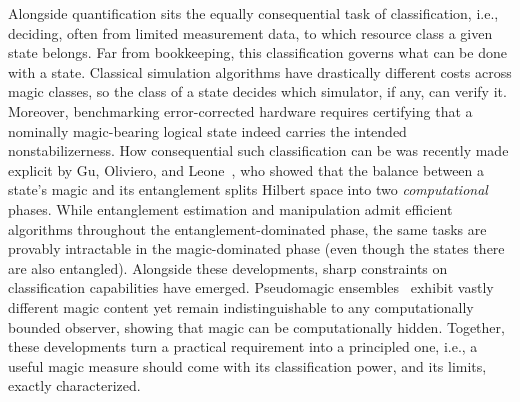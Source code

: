 \documentclass[aps,pra,superscriptaddress,twocolumn,longbibliography]{revtex4-2}
\newcounter{algorithm}
\begin{document}
Alongside quantification sits the equally consequential task of classification, i.e., deciding, often from limited measurement data, to which resource class a given state belongs. Far from bookkeeping, this classification governs what can be done with a state. Classical simulation algorithms have drastically different costs across magic classes, so the class of a state decides which simulator, if any, can verify it.
Moreover, benchmarking error-corrected hardware requires certifying that a nominally magic-bearing logical state indeed carries the intended nonstabilizerness. 
How consequential such classification can be was recently made explicit by Gu, Oliviero, and Leone~\cite{Gu/Magic_vs_Ent/2024}, who showed that the balance between a state's magic and its entanglement splits Hilbert space into two \textit{computational} phases.
While entanglement estimation and manipulation admit efficient algorithms throughout the entanglement-dominated phase, the same tasks are provably intractable in the magic-dominated phase (even though the states there are also entangled).
Alongside these developments, sharp constraints on classification capabilities have emerged. 
Pseudomagic ensembles~\cite{Gu/pseudomagic/2024,Aaronson/pseudoentanglement/2022} exhibit vastly different magic content yet remain indistinguishable to any computationally bounded observer, showing that magic can be computationally hidden. Together, these developments turn a practical requirement into a principled one, i.e., a useful magic measure should come with its classification power, and its limits, exactly characterized.
\end{document}

